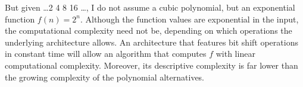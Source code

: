 
But given \dots 2 4 8 16 \dots, I do not assume a cubic polynomial, but an exponential function $f(n)=2^n$. Although the function values are exponential in the input, the computational complexity need not be, depending on which operations the underlying architecture allows. An architecture that features bit shift operations in constant time will allow an algorithm that computes $f$ with linear computational complexity.
Moreover, its descriptive complexity is far lower than the growing complexity of the polynomial alternatives.

